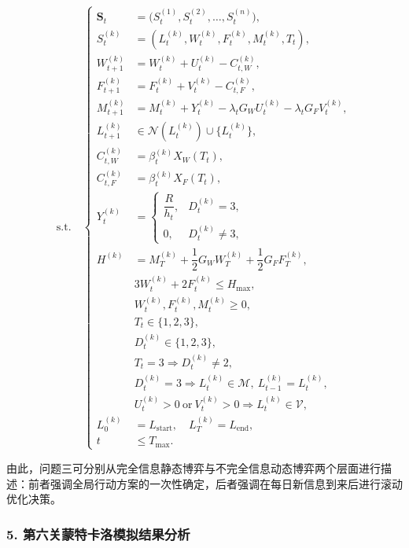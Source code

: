 \documentclass[UTF8,a4paper,12pt]{ctexart}
\begin{document}
\[
\mathrm{s.t.}\quad
\left\{
\begin{aligned}
\mathbf{S}_t      & = \bigl(S_t^{(1)},S_t^{(2)},\dots,S_t^{(n)}\bigr),\\
S_t^{(k)}          & = (L_t^{(k)},W_t^{(k)},F_t^{(k)},M_t^{(k)},T_t),\\
W_{t+1}^{(k)}      & = W_t^{(k)}+U_t^{(k)}-C_{t,W}^{(k)},\\
F_{t+1}^{(k)}      & = F_t^{(k)}+V_t^{(k)}-C_{t,F}^{(k)},\\
M_{t+1}^{(k)}      & = M_t^{(k)}+Y_t^{(k)}-\lambda_tG_WU_t^{(k)}-\lambda_tG_FV_t^{(k)},\\
L_{t+1}^{(k)}      & \in \mathcal{N}(L_t^{(k)})\cup\{L_t^{(k)}\},\\
C_{t,W}^{(k)}      & = \beta_t^{(k)}X_W(T_t),\\
C_{t,F}^{(k)}      & = \beta_t^{(k)}X_F(T_t),\\
Y_t^{(k)}          & =
\begin{cases}
\dfrac{R}{h_t}, & D_t^{(k)}=3,\\
0, & D_t^{(k)}\neq 3,
\end{cases}\\
H^{(k)}            & = M_T^{(k)}+\dfrac12 G_WW_T^{(k)}+\dfrac12 G_FF_T^{(k)},\\
                   & 3W_t^{(k)}+2F_t^{(k)} \le H_{\max},\\
                   & W_t^{(k)},F_t^{(k)},M_t^{(k)} \ge 0,\\
                   & T_t \in \{1,2,3\},\\
                   & D_t^{(k)} \in \{1,2,3\},\\
                   & T_t=3 \Rightarrow D_t^{(k)}\neq 2,\\
                   & D_t^{(k)}=3 \Rightarrow L_t^{(k)}\in\mathcal{M},\ L_{t-1}^{(k)}=L_t^{(k)},\\
                   & U_t^{(k)}>0\ \text{or}\ V_t^{(k)}>0 \Rightarrow L_t^{(k)}\in\mathcal{V},\\
L_0^{(k)}          & = L_{\mathrm{start}},\quad L_T^{(k)}=L_{\mathrm{end}},\\
t                  & \le T_{\max}.
\end{aligned}
\right.
\]

由此，问题三可分别从完全信息静态博弈与不完全信息动态博弈两个层面进行描述：前者强调全局行动方案的一次性确定，后者强调在每日新信息到来后进行滚动优化决策。

\subsubsection*{5. 第六关蒙特卡洛模拟结果分析}
\end{document}
